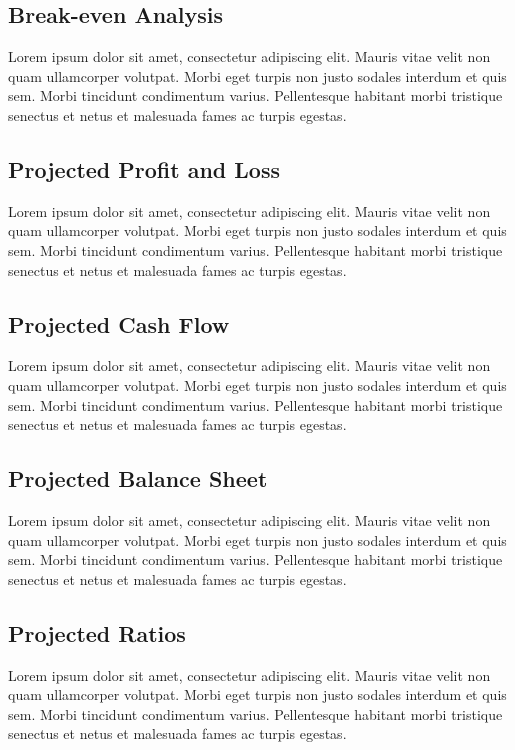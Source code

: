 \documentclass[11pt]{article}
\begin{document}
\subsection{Break-even Analysis}
Lorem ipsum dolor sit amet, consectetur adipiscing elit. Mauris vitae velit 
non quam ullamcorper volutpat. Morbi eget turpis non justo sodales interdum 
et quis sem. Morbi tincidunt condimentum varius. Pellentesque habitant morbi 
tristique senectus et netus et malesuada fames ac turpis egestas.\newline
\subsection{Projected Profit and Loss}
Lorem ipsum dolor sit amet, consectetur adipiscing elit. Mauris vitae velit 
non quam ullamcorper volutpat. Morbi eget turpis non justo sodales interdum 
et quis sem. Morbi tincidunt condimentum varius. Pellentesque habitant morbi 
tristique senectus et netus et malesuada fames ac turpis egestas.\newline
\subsection{Projected Cash Flow}
Lorem ipsum dolor sit amet, consectetur adipiscing elit. Mauris vitae velit 
non quam ullamcorper volutpat. Morbi eget turpis non justo sodales interdum 
et quis sem. Morbi tincidunt condimentum varius. Pellentesque habitant morbi 
tristique senectus et netus et malesuada fames ac turpis egestas.\newline
\subsection{Projected Balance Sheet}
Lorem ipsum dolor sit amet, consectetur adipiscing elit. Mauris vitae velit 
non quam ullamcorper volutpat. Morbi eget turpis non justo sodales interdum 
et quis sem. Morbi tincidunt condimentum varius. Pellentesque habitant morbi 
tristique senectus et netus et malesuada fames ac turpis egestas.\newline
\subsection{Projected Ratios}
Lorem ipsum dolor sit amet, consectetur adipiscing elit. Mauris vitae velit 
non quam ullamcorper volutpat. Morbi eget turpis non justo sodales interdum 
et quis sem. Morbi tincidunt condimentum varius. Pellentesque habitant morbi 
tristique senectus et netus et malesuada fames ac turpis egestas.\newline
\pagebreak
\end{document}
